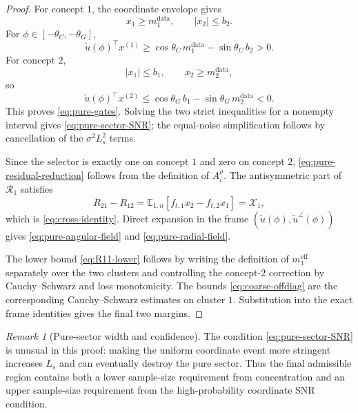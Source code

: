 \documentclass{article} %
\theoremstyle{plain}
\theoremstyle{definition}
\theoremstyle{remark}
\newtheorem{remark}[theorem]{Remark}
\begin{document}
\begin{proof}
For concept $1$, the coordinate envelope gives
\[
x_1\ge m_1^{\mathrm{data}},
\qquad
|x_2|\le b_2.
\]
For $\phi\in[-\theta_C,-\theta_G]$,
\[
\widetilde u(\phi)^\top x^{(1)}
\ge
\cos\theta_C\,m_1^{\mathrm{data}}
-
\sin\theta_C\,b_2>0.
\]
For concept $2$,
\[
|x_1|\le b_1,
\qquad
x_2\ge m_2^{\mathrm{data}},
\]
so
\[
\widetilde u(\phi)^\top x^{(2)}
\le
\cos\theta_G\,b_1
-
\sin\theta_G\,m_2^{\mathrm{data}}<0.
\]
This proves \eqref{eq:pure-gates}.  Solving the two strict inequalities for a
nonempty interval gives \eqref{eq:pure-sector-SNR}; the equal-noise
simplification follows by cancellation of the $\sigma^2L_s^2$ terms.

Since the selector is exactly one on concept $1$ and zero on concept $2$,
\eqref{eq:pure-residual-reduction} follows from the definition of
$A_i^\rho$.  The antisymmetric part of $\mathcal R_1$ satisfies
\[
R_{21}-R_{12}
=
\mathbb E_{1,n}[f_{t,1}x_2-f_{t,2}x_1]
=
\mathcal X_1,
\]
which is \eqref{eq:cross-identity}.  Direct expansion in the frame
$(\widetilde u(\phi),\widetilde u^\angle(\phi))$ gives
\eqref{eq:pure-angular-field} and \eqref{eq:pure-radial-field}.

The lower bound \eqref{eq:R11-lower} follows by writing the definition of
$m_1^{\mathrm{eff}}$ separately over the two clusters and controlling the
concept-$2$ correction by Cauchy--Schwarz and loss monotonicity.  The bounds
\eqref{eq:coarse-offdiag} are the corresponding Cauchy--Schwarz estimates on
cluster $1$.  Substitution into the exact frame identities gives the final
two margins.
\end{proof}

\begin{remark}[Pure-sector width and confidence]
The condition \eqref{eq:pure-sector-SNR} is unusual in this proof: making the
uniform coordinate event more stringent increases $L_s$ and can eventually
destroy the pure sector.  Thus the final admissible region contains both a
lower sample-size requirement from concentration and an upper sample-size
requirement from the high-probability coordinate SNR condition.
\end{remark}

\end{document}
